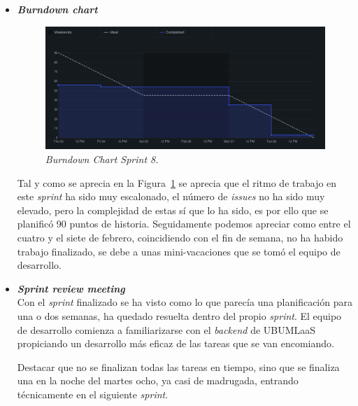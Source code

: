 \begin{itemize}
\item \textbf{\textit{Burndown chart}}\\
\begin{figure}
\begin{center}
\includegraphics[width=\textwidth]{../img/anexos/sprints/BD-Sprint8}
\caption{\textit{Burndown Chart Sprint 8.}}\label{fig:BD-Sprint8}
\end{center}
\end{figure}
Tal y como se aprecia en la Figura~\ref{fig:BD-Sprint8} se aprecia que el ritmo de trabajo en este \textit{sprint} ha sido muy escalonado, el número de \textit{issues} no ha sido muy elevado, pero la complejidad de estas sí que lo ha sido, es por ello que se planificó 90 puntos de historia. Seguidamente podemos apreciar como entre el cuatro y el siete de febrero, coincidiendo con el fin de semana, no ha habido trabajo finalizado, se debe a unas mini-vacaciones que se tomó el equipo de desarrollo.

\item \textbf{\textit{Sprint review meeting}}\\
Con el \textit{sprint} finalizado se ha visto como lo que parecía una planificación para una o dos semanas, ha quedado resuelta dentro del propio \textit{sprint}. El equipo de desarrollo comienza a familiarizarse con el \textit{backend} de UBUMLaaS propiciando un desarrollo más eficaz de las tareas que se van encomiando.

Destacar que no se finalizan todas las tareas en tiempo, sino que se finaliza una en la noche del martes ocho, ya casi de madrugada, entrando técnicamente en el siguiente \textit{sprint}.

\end{itemize}

